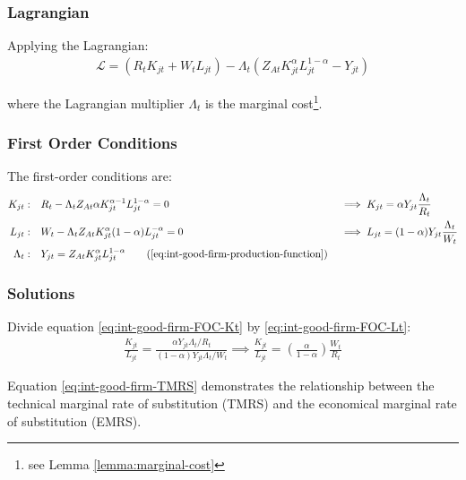 \documentclass[
thesis.tex
]{subfiles}
\begin{document}
	
	\subsubsection*{Lagrangian}
	
	Applying the Lagrangian:
	\begin{align}
		\label{eq:int-good-firm-lagrangian}
		\mathcal{L} = (R_t K_{jt} + W_t L_{jt}) - \Lambda_t (Z_{At} K_{jt}^\alpha L_{jt}^{1-\alpha} - Y_{jt})
	\end{align}
	
	where the Lagrangian multiplier $\Lambda_t$ is the marginal cost\footnote{see Lemma \ref{lemma:marginal-cost}}.
	
	\subsubsection*{First Order Conditions}
	
	The first-order conditions are:
	\begin{alignat}{2}
		K_{jt}: \quad & R_t - \Lambda_t Z_{At} \alpha K_{jt}^{\alpha-1} L_{jt}^{1-\alpha} = 0 &&\implies K_{jt} = \alpha Y_{jt} \frac{\Lambda_t}{R_t} \label{eq:int-good-firm-FOC-Kt} \\
		L_{jt}: \quad & W_t - \Lambda_t Z_{At} K_{jt}^\alpha (1-\alpha) L_{jt}^{-\alpha} = 0 \quad &&\implies L_{jt} = (1-\alpha) Y_{jt} \frac{\Lambda_t}{W_t} \label{eq:int-good-firm-FOC-Lt} \\
		\Lambda_t: \quad & Y_{jt} = Z_{At} K_{jt}^\alpha L_{jt}^{1-\alpha} \tag{\ref{eq:int-good-firm-production-function}}
	\end{alignat}
	
	\subsubsection*{Solutions}
	
	Divide equation \ref{eq:int-good-firm-FOC-Kt} by \ref{eq:int-good-firm-FOC-Lt}:
	\begin{align}
		\frac{K_{jt}}{L_{jt}} = \frac{\alpha Y_{jt} \Lambda_t /R_t}{(1-\alpha) Y_{jt} \Lambda_t /W_t} \implies
		\frac{K_{jt}}{L_{jt}} = \left( \frac{\alpha}{1-\alpha} \right) \frac{W_t}{R_t} \label{eq:int-good-firm-TMRS}
	\end{align}
	
	Equation \ref{eq:int-good-firm-TMRS} demonstrates the relationship between the technical marginal rate of substitution (TMRS) and the economical marginal rate of substitution (EMRS). 
	
\end{document}
